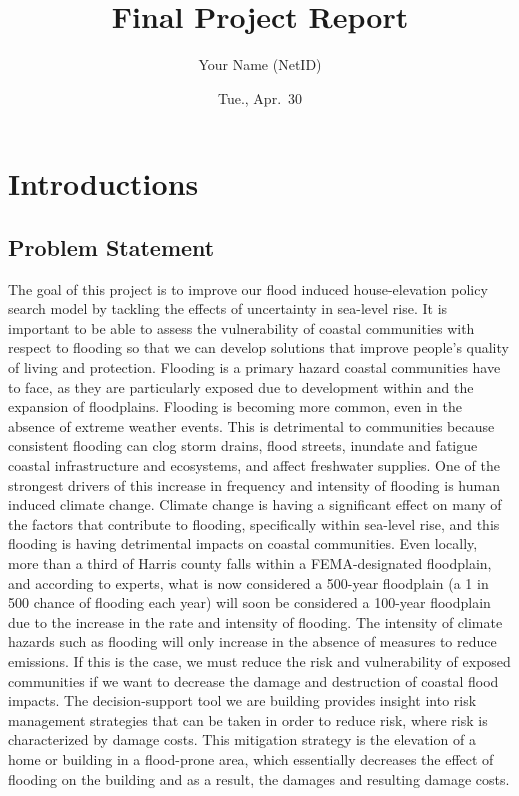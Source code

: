 \documentclass[
  11pt,
]{article}
\title{Final Project Report}
\author{Your Name (NetID)}
\date{Tue., Apr.~30}
\begin{document}
\maketitle

\section{Introductions}\label{introductions}

\subsection{Problem Statement}\label{problem-statement}

The goal of this project is to improve our flood induced house-elevation
policy search model by tackling the effects of uncertainty in sea-level
rise. It is important to be able to assess the vulnerability of coastal
communities with respect to flooding so that we can develop solutions
that improve people's quality of living and protection. Flooding is a
primary hazard coastal communities have to face, as they are
particularly exposed due to development within and the expansion of
floodplains. Flooding is becoming more common, even in the absence of
extreme weather events. This is detrimental to communities because
consistent flooding can clog storm drains, flood streets, inundate and
fatigue coastal infrastructure and ecosystems, and affect freshwater
supplies. One of the strongest drivers of this increase in frequency and
intensity of flooding is human induced climate change. Climate change is
having a significant effect on many of the factors that contribute to
flooding, specifically within sea-level rise, and this flooding is
having detrimental impacts on coastal communities. Even locally, more
than a third of Harris county falls within a FEMA-designated floodplain,
and according to experts, what is now considered a 500-year floodplain
(a 1 in 500 chance of flooding each year) will soon be considered a
100-year floodplain due to the increase in the rate and intensity of
flooding. The intensity of climate hazards such as flooding will only
increase in the absence of measures to reduce emissions. If this is the
case, we must reduce the risk and vulnerability of exposed communities
if we want to decrease the damage and destruction of coastal flood
impacts. The decision-support tool we are building provides insight into
risk management strategies that can be taken in order to reduce risk,
where risk is characterized by damage costs. This mitigation strategy is
the elevation of a home or building in a flood-prone area, which
essentially decreases the effect of flooding on the building and as a
result, the damages and resulting damage costs.
\end{document}
